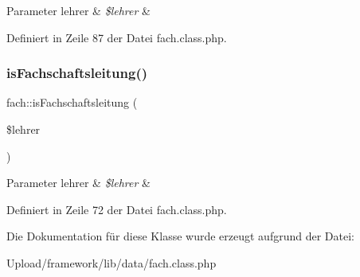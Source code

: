 \begin{DoxyParams}[1]{Parameter}
lehrer & {\em \$lehrer} & \\
\hline
\end{DoxyParams}


Definiert in Zeile 87 der Datei fach.\+class.\+php.

\mbox{\label{classfach_a813e31188d3ec8ef4a84c8ffdee2d88f}} 
\subsubsection{\texorpdfstring{is\+Fachschaftsleitung()}{isFachschaftsleitung()}}
{\footnotesize\ttfamily fach\+::is\+Fachschaftsleitung (\begin{DoxyParamCaption}\item[{}]{\$lehrer }\end{DoxyParamCaption})}


\begin{DoxyParams}[1]{Parameter}
lehrer & {\em \$lehrer} & \\
\hline
\end{DoxyParams}


Definiert in Zeile 72 der Datei fach.\+class.\+php.



Die Dokumentation für diese Klasse wurde erzeugt aufgrund der Datei\+:\begin{DoxyCompactItemize}
\item 
Upload/framework/lib/data/fach.\+class.\+php\end{DoxyCompactItemize}
